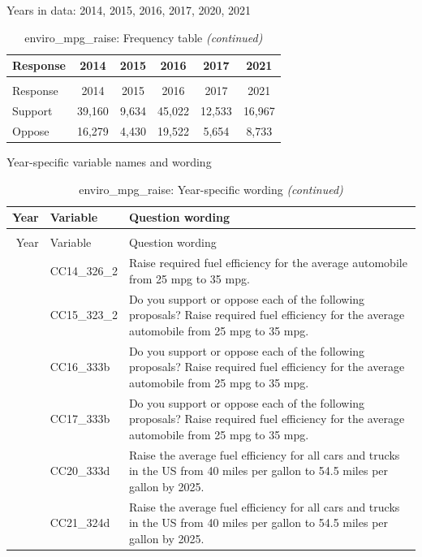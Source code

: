 \documentclass[
  12pt]{article}
\begin{document}
Years in data: 2014, 2015, 2016, 2017, 2020,
2021\begingroup\fontsize{10}{12}\selectfont

\begin{longtable}[t]{lccccc}
\caption{\label{tab:unnamed-chunk-5}enviro\_mpg\_raise: Frequency table}\\
\toprule
Response & 2014 & 2015 & 2016 & 2017 & 2021\\
\midrule
\endfirsthead
\caption[]{enviro\_mpg\_raise: Frequency table \textit{(continued)}}\\
\toprule
Response & 2014 & 2015 & 2016 & 2017 & 2021\\
\midrule
\endhead

\endfoot
\bottomrule
\endlastfoot
Support & 39,160 & 9,634 & 45,022 & 12,533 & 16,967\\
Oppose & 16,279 & 4,430 & 19,522 & 5,654 & 8,733\\*
\end{longtable}
\endgroup{}

Year-specific variable names and
wording\begingroup\fontsize{11}{13}\selectfont

\begin{longtable}[t]{rl>{\raggedright\arraybackslash}p{10cm}}
\caption{\label{tab:unnamed-chunk-5}enviro\_mpg\_raise: Year-specific wording}\\
\toprule
Year & Variable & Question wording\\
\midrule
\endfirsthead
\caption[]{enviro\_mpg\_raise: Year-specific wording \textit{(continued)}}\\
\toprule
Year & Variable & Question wording\\
\midrule
\endhead

\endfoot
\bottomrule
\endlastfoot
2014 & CC14\_326\_2 & Raise required fuel efficiency for the average automobile from 25 mpg to 35 mpg.\\
\addlinespace
2015 & CC15\_323\_2 & Do you support or oppose each of the following proposals? Raise required fuel efficiency for the average automobile from 25 mpg to 35 mpg.\\
\addlinespace
2016 & CC16\_333b & Do you support or oppose each of the following proposals? Raise required fuel efficiency for the average automobile from 25 mpg to 35 mpg.\\
\addlinespace
2017 & CC17\_333b & Do you support or oppose each of the following proposals? Raise required fuel efficiency for the average automobile from 25 mpg to 35 mpg.\\
\addlinespace
2020 & CC20\_333d & Raise the average fuel efficiency for all cars and trucks in the US from 40 miles per gallon to 54.5 miles per gallon by 2025.\\
\addlinespace
2021 & CC21\_324d & Raise the average fuel efficiency for all cars and trucks in the US from 40 miles per gallon to 54.5 miles per gallon by 2025.\\*
\end{longtable}
\endgroup{}
\end{document}
